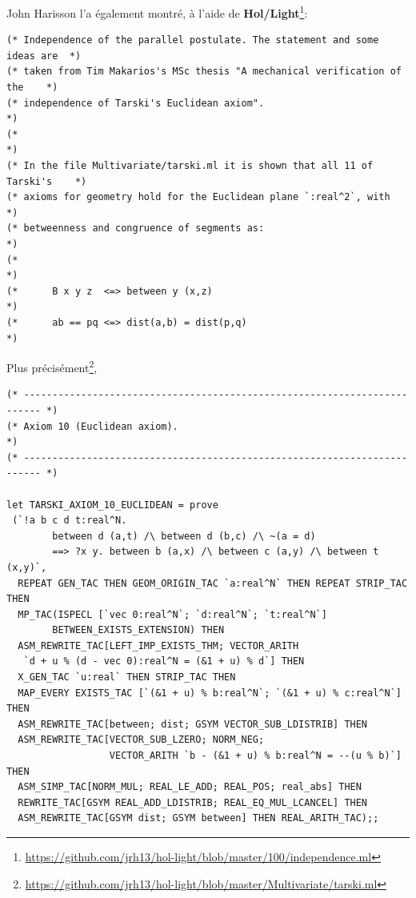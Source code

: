 \documentclass[8pt,a4paper]{article}
\theoremstyle{plain}
\begin{document}
  
John Harisson l'a également montré, à l'aide de \textbf{Hol/Light}\footnote{\url{https://github.com/jrh13/hol-light/blob/master/100/independence.ml}}: 
\begin{verbatim}
(* Independence of the parallel postulate. The statement and some ideas are  *)
(* taken from Tim Makarios's MSc thesis "A mechanical verification of the    *)
(* independence of Tarski's Euclidean axiom".                                *)
(*                                                                           *)
(* In the file Multivariate/tarski.ml it is shown that all 11 of Tarski's    *)
(* axioms for geometry hold for the Euclidean plane `:real^2`, with          *)
(* betweenness and congruence of segments as:                                *)
(*                                                                           *)
(*      B x y z  <=> between y (x,z)                                         *)
(*      ab == pq <=> dist(a,b) = dist(p,q)                                   *)
\end{verbatim}
Plus précisément\footnote{\url{https://github.com/jrh13/hol-light/blob/master/Multivariate/tarski.ml}},
\begin{verbatim}
(* ------------------------------------------------------------------------- *)
(* Axiom 10 (Euclidean axiom).                                               *)
(* ------------------------------------------------------------------------- *)

let TARSKI_AXIOM_10_EUCLIDEAN = prove
 (`!a b c d t:real^N.
        between d (a,t) /\ between d (b,c) /\ ~(a = d)
        ==> ?x y. between b (a,x) /\ between c (a,y) /\ between t (x,y)`,
  REPEAT GEN_TAC THEN GEOM_ORIGIN_TAC `a:real^N` THEN REPEAT STRIP_TAC THEN
  MP_TAC(ISPECL [`vec 0:real^N`; `d:real^N`; `t:real^N`]
        BETWEEN_EXISTS_EXTENSION) THEN
  ASM_REWRITE_TAC[LEFT_IMP_EXISTS_THM; VECTOR_ARITH
   `d + u % (d - vec 0):real^N = (&1 + u) % d`] THEN
  X_GEN_TAC `u:real` THEN STRIP_TAC THEN
  MAP_EVERY EXISTS_TAC [`(&1 + u) % b:real^N`; `(&1 + u) % c:real^N`] THEN
  ASM_REWRITE_TAC[between; dist; GSYM VECTOR_SUB_LDISTRIB] THEN
  ASM_REWRITE_TAC[VECTOR_SUB_LZERO; NORM_NEG;
                  VECTOR_ARITH `b - (&1 + u) % b:real^N = --(u % b)`] THEN
  ASM_SIMP_TAC[NORM_MUL; REAL_LE_ADD; REAL_POS; real_abs] THEN
  REWRITE_TAC[GSYM REAL_ADD_LDISTRIB; REAL_EQ_MUL_LCANCEL] THEN
  ASM_REWRITE_TAC[GSYM dist; GSYM between] THEN REAL_ARITH_TAC);;
\end{verbatim}
\end{document}
